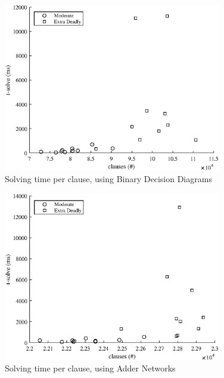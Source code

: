 {\begin{figure}
    \centering
    \includegraphics[width = 0.85\textwidth]{Figures/killer_BDD_solve.eps}
    \caption{Solving time per clause, using Binary Decision Diagrams}
    \label{killerBDDsolve}
\end{figure}

\begin{figure}
    \centering
    \includegraphics[width = 0.85\textwidth]{Figures/killer_AN_solve.eps}
    \caption{Solving time per clause, using Adder Networks}
    \label{killerANsolve}
\end{figure}

}
